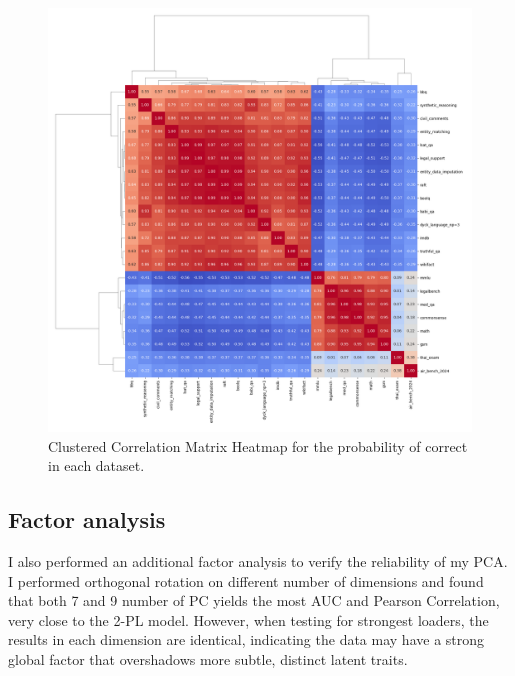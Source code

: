 \begin{figure}[!t]
    \centering
    \includegraphics[height=\linewidth]{figures/resmat_corr_scenario.png}
    \caption{Clustered Correlation Matrix Heatmap for the probability of correct in each dataset.}
    \label{fig:resmat_corr_scenario}
\end{figure}

\subsection{Factor analysis}

I also performed an additional factor analysis to verify the reliability of my PCA. I performed orthogonal rotation on different number of dimensions and found that both 7 and 9 number of PC yields the most AUC and Pearson Correlation, very close to the 2-PL model. However, when testing for strongest loaders, the results in each dimension are identical, indicating the data may have a strong global factor that overshadows more subtle, distinct latent traits.
